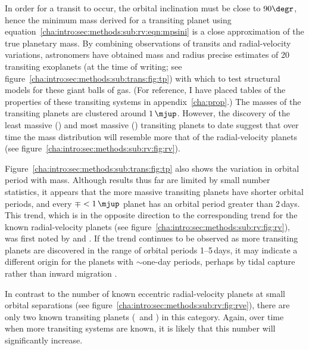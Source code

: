 In order for a transit to occur, the orbital inclination must be close to $90\degr$, hence the minimum mass derived for a transiting planet using equation~\ref{cha:intro:sec:methods:sub:rv:eqn:mpsini} is a close approximation of the true planetary mass.
By combining observations of transits and radial-velocity variations, astronomers have obtained mass and radius precise estimates of 20 transiting exoplanets (at the time of writing; see figure~\ref{cha:intro:sec:methods:sub:trans:fig:tp}) with which to test structural models for these giant balls of gas.
(For reference, I have placed tables of the properties of these transiting systems in appendix~\ref{cha:prop}.)
The masses of the transiting planets are clustered around $1\,\mjup$.
However, the discovery of the least massive (\gjFTSb) and most massive (\hatptwob) transiting planets to date suggest that over time the mass distribution will resemble more that of the radial-velocity planets (see figure~\ref{cha:intro:sec:methods:sub:rv:fig:rv}).

Figure~\ref{cha:intro:sec:methods:sub:trans:fig:tp} also shows the variation in orbital period with mass.
Although results thus far are limited by small number statistics, it appears that the more massive transiting planets have shorter orbital periods, and every $\mp<1\,\mjup$ planet has an orbital period greater than 2\,days.
This trend, which is in the opposite direction to the corresponding trend for the known radial-velocity planets (see figure~\ref{cha:intro:sec:methods:sub:rv:fig:rv}), was first noted by \citet*{Mazeh_Zucker_Pont:mnras:2005a} and \citet*{Gaudi_Seager_Mallen-Ornelas:apj:2005a}.
If the trend continues to be observed as more transiting planets are discovered in the range of orbital periods 1--5\,days, it may indicate a different origin for the planets with $\sim$one-day periods, perhaps by tidal capture rather than inward migration \citep{Gaudi_Winn:apj:2007a}.

In contrast to the number of known eccentric radial-velocity planets at small orbital separations (see figure~\ref{cha:intro:sec:methods:sub:rv:fig:rve}), there are only two known transiting planets (\gjFTSb\ and \hatptwob) in this category.
Again, over time when more transiting systems are known, it is likely that this number will significantly increase.

